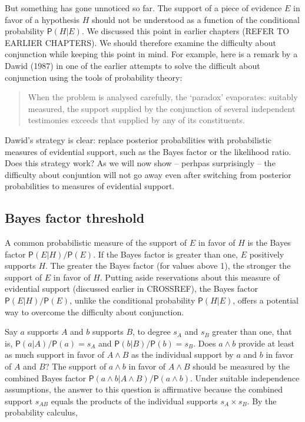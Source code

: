 \documentclass[10pt,dvipsnames,enabledeprecatedfontcommands]{scrartcl}
\newcommand{\et}{\wedge}
\newcommand{\pr}[1]{\mathsf{P}(#1)}
\begin{document}
But something has gone unnoticed so far. The support of a piece of
evidence \(E\) in favor of a hypothesis \(H\) should not be understood
as a function of the conditional probability \(\pr{H | E}\). We
discussed this point in earlier chapters (REFER TO EARLIER CHAPTERS). We
should therefore examine the difficulty about conjunction while keeping
this point in mind. For example, here is a remark by a Dawid (1987) in
one of the earlier attempts to solve the difficult about conjunction
using the tools of probability theory:

\begin{quote} When the problem is analysed carefully, the `paradox' evaporates: suitably measured, 
 the support supplied by the conjunction of several independent 
 testimonies exceeds that supplied by any of its constituents.
 \end{quote}

\noindent Dawid's strategy is clear: replace posterior probabilities
with probabilistic measures of evidential support, such as the Bayes
factor or the likelihood ratio. Does this strategy work? As we will now
show -- perhpas surprisingly -- the difficulty about conjuntion will not
go away even after switching from posterior probabilities to measures of
evidential support.

\hypertarget{bayes-factor-threshold}{%
\subsection{Bayes factor threshold}\label{bayes-factor-threshold}}

A common probabilistic measure of the support of \(E\) in favor of \(H\)
is the Bayes factor \(\pr{E | H}/\pr{E}\). If the Bayes factor is
greater than one, \(E\) positively supports \(H\). The greater the Bayes
factor (for values above 1), the stronger the support of \(E\) in favor
of \(H\). Putting aside reservations about this measure of evidential
support (discussed earlier in CROSSREF), the Bayes factor
\(\pr{E | H}/\pr{E}\), unlike the conditional probability
\(\pr{H | E}\), offers a potential way to overcome the difficulty about
conjunction.

Say \(a\) supports \(A\) and \(b\) supports \(B\), to degree \(s_A\) and
\(s_B\) greater than one, that is, \(\pr{a | A}/\pr{a}=s_A\) and
\(\pr{b | B}/\pr{b}=s_B\). Does \(a \wedge b\) provide at least as much
support in favor of \(A \wedge B\) as the individual support by \(a\)
and \(b\) in favor of \(A\) and \(B\)? The support of \(a\et b\) in
favor of \(A\et B\) should be measured by the combined Bayes factor
\(\pr{a \wedge b| A\wedge B}/\pr{a \wedge b}\). Under suitable
independence assumptions, the answer to this question is affirmative
because the combined support \(s_{AB}\) equals the products of the
individual supports \(s_{A}\times s_{B}\). By the probability calculus,
\end{document}
